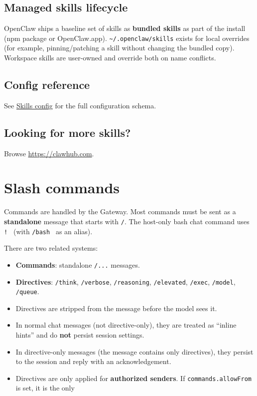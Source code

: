 \subsection{Managed skills lifecycle}


OpenClaw ships a baseline set of skills as \textbf{bundled skills} as part of the
install (npm package or OpenClaw.app). \texttt{\textasciitilde{}/.openclaw/skills} exists for local
overrides (for example, pinning/patching a skill without changing the bundled
copy). Workspace skills are user-owned and override both on name conflicts.

\subsection{Config reference}


See \href{/tools/skills-config}{Skills config} for the full configuration schema.

\subsection{Looking for more skills?}


Browse \href{https://clawhub.com}{https://clawhub.com}.

\hrulefill



\clearpage

\section{Slash commands}


Commands are handled by the Gateway. Most commands must be sent as a \textbf{standalone} message that starts with \texttt{/}.
The host-only bash chat command uses \texttt{! } (with \texttt{/bash } as an alias).

There are two related systems:

\begin{itemize}
  \item \textbf{Commands}: standalone \texttt{/...} messages.
  \item \textbf{Directives}: \texttt{/think}, \texttt{/verbose}, \texttt{/reasoning}, \texttt{/elevated}, \texttt{/exec}, \texttt{/model}, \texttt{/queue}.
  \item Directives are stripped from the message before the model sees it.
  \item In normal chat messages (not directive-only), they are treated as “inline hints” and do \textbf{not} persist session settings.
  \item In directive-only messages (the message contains only directives), they persist to the session and reply with an acknowledgement.
  \item Directives are only applied for \textbf{authorized senders}. If \texttt{commands.allowFrom} is set, it is the only
\end{itemize}

